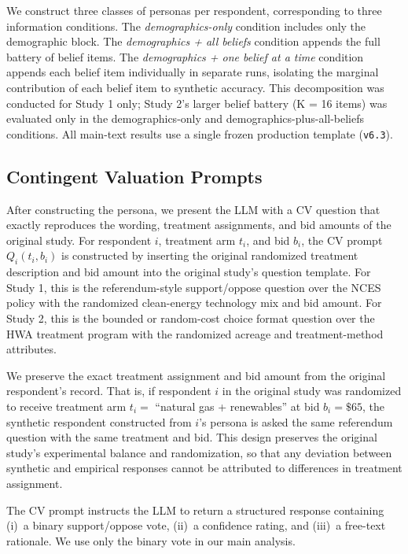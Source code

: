 \documentclass[12pt]{article}
\begin{document}

We construct three classes of personas per respondent, corresponding to
three information conditions. The \textit{demographics-only} condition
includes only the demographic block. The \textit{demographics + all
beliefs} condition appends the full battery of belief items. The \textit{demographics + one belief at a time} condition appends each belief
item individually in separate runs, isolating the marginal contribution of
each belief item to synthetic accuracy. This decomposition was conducted for Study 1 only; Study 2’s larger belief battery (K = 16 items) was evaluated only in the demographics-only and demographics-plus-all-beliefs conditions. All main-text results use a single frozen production template (\texttt{v6.3}).


\subsection{Contingent Valuation Prompts}\label{sec:methods-cv-prompts}

After constructing the persona, we present the LLM with a CV question that
exactly reproduces the wording, treatment assignments, and bid amounts of
the original study. For respondent $i$, treatment arm $t_i$, and bid $b_i$,
the CV prompt $Q_i(t_i, b_i)$ is constructed by inserting the original
randomized treatment description and bid amount into the original study's
question template. For Study 1, this is the referendum-style support/oppose
question over the NCES policy with the randomized clean-energy technology
mix and bid amount. For Study 2, this is the bounded or random-cost choice
format question over the HWA treatment program with the randomized acreage
and treatment-method attributes.

We preserve the exact treatment assignment and bid amount from the original
respondent's record. That is, if respondent $i$ in the original study was
randomized to receive treatment arm $t_i = $ ``natural gas + renewables''
at bid $b_i = \$65$, the synthetic respondent constructed from $i$'s
persona is asked the same referendum question with the same treatment and
bid. This design preserves the original study's experimental balance and
randomization, so that any deviation between synthetic and empirical
responses cannot be attributed to differences in treatment assignment.

The CV prompt instructs the LLM to return a structured response containing
(i)~a binary support/oppose vote, (ii)~a confidence rating, and (iii)~a
free-text rationale. We use only the binary vote in our main analysis.
\end{document}

